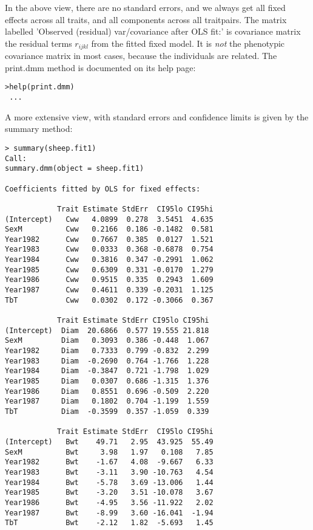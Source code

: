 \documentclass[titlepage]{article}  %
\begin{document}
 In the above view, there are no standard errors, and we always get all fixed effects across all traits, and all components across all traitpairs. The matrix labelled 'Observed (residual) var/covariance after OLS fit:' is covariance matrix the residual terms $r_{ijkl}$ from the fitted fixed model. It is {\em not} the phenotypic covariance matrix in most cases, because the individuals are related. The print.dmm method is documented on its help page:

\begin{verbatim}
>help(print.dmm)
 ...
\end{verbatim}

 A more extensive view, with standard errors and confidence limits is given by the summary method:

\begin{verbatim}
> summary(sheep.fit1)
Call:
summary.dmm(object = sheep.fit1)

Coefficients fitted by OLS for fixed effects:

            Trait Estimate StdErr  CI95lo CI95hi
(Intercept)   Cww   4.0899  0.278  3.5451  4.635
SexM          Cww   0.2166  0.186 -0.1482  0.581
Year1982      Cww   0.7667  0.385  0.0127  1.521
Year1983      Cww   0.0333  0.368 -0.6878  0.754
Year1984      Cww   0.3816  0.347 -0.2991  1.062
Year1985      Cww   0.6309  0.331 -0.0170  1.279
Year1986      Cww   0.9515  0.335  0.2943  1.609
Year1987      Cww   0.4611  0.339 -0.2031  1.125
TbT           Cww   0.0302  0.172 -0.3066  0.367

            Trait Estimate StdErr CI95lo CI95hi
(Intercept)  Diam  20.6866  0.577 19.555 21.818
SexM         Diam   0.3093  0.386 -0.448  1.067
Year1982     Diam   0.7333  0.799 -0.832  2.299
Year1983     Diam  -0.2690  0.764 -1.766  1.228
Year1984     Diam  -0.3847  0.721 -1.798  1.029
Year1985     Diam   0.0307  0.686 -1.315  1.376
Year1986     Diam   0.8551  0.696 -0.509  2.220
Year1987     Diam   0.1802  0.704 -1.199  1.559
TbT          Diam  -0.3599  0.357 -1.059  0.339

            Trait Estimate StdErr  CI95lo CI95hi
(Intercept)   Bwt    49.71   2.95  43.925  55.49
SexM          Bwt     3.98   1.97   0.108   7.85
Year1982      Bwt    -1.67   4.08  -9.667   6.33
Year1983      Bwt    -3.11   3.90 -10.763   4.54
Year1984      Bwt    -5.78   3.69 -13.006   1.44
Year1985      Bwt    -3.20   3.51 -10.078   3.67
Year1986      Bwt    -4.95   3.56 -11.922   2.02
Year1987      Bwt    -8.99   3.60 -16.041  -1.94
TbT           Bwt    -2.12   1.82  -5.693   1.45



\end{verbatim}
\end{document}
